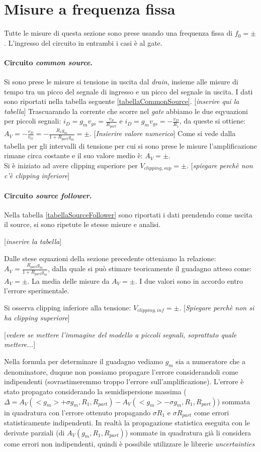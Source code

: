 \documentclass[10pt,a4paper]{article}
\newcommand{\rem}[1]{[\emph{#1}]}
\begin{document}
\section{Misure a frequenza fissa}
Tutte le misure di questa sezione sono prese usando una frequenza fissa di $f_0 = \pm$. L'ingresso del circuito in entrambi i casi è al gate.
\paragraph{Circuito \emph{common source}.}
Si sono prese le misure si tensione in uscita dal \emph{drain}, insieme alle misure di tempo tra un picco del segnale di ingresso e un picco del segnale in uscita. I dati sono riportati nella tabella seguente \ref{tabellaCommonSource}.
\rem{inserire qui la tabella}
Trascuarando la corrente che scorre nel \emph{gate} abbiamo le due eqyuazioni per piccoli segnali: $i_D = g_m v_{gs} = \frac{v_S}{R_{part}}$ e $i_D = g_m v_{gs} = -\frac{v_D}{R_1}$, da queste si ottiene: $A_V = -\frac{v_D}{v_G} = - \frac{R_1 g_m}{1+R_{part} g_m} = \pm $. \rem{Insierire valore numerico}
Come si vede dalla tabella per gli intervalli di tensione per cui si sono prese le misure l'amplificazione rimane circa costante e il suo valore medio è: $A_V = \pm$. \\
Si è iniziato ad avere clipping superiore per $V_{clipping, sup} = \pm $.
\rem{spiegare perchè non c'è clipping inferiore}

\paragraph{Circuito \emph{source follower}.}
Nella tabella \ref{tabellaSourceFollower} sono riportati i dati prendendo come uscita il source, si sono ripetute le stesse misure e analisi.

\rem{inserire la tabella}

Dalle stese equazioni della sezione precedente otteniamo la relazione: $A_V = \frac{R_{part} g_m}{1+R_{part} g_m}$, dalla quale si può stimare teoricamente il guadagno atteso come: $A_V = \pm$. La media delle misure da $A_V = \pm$. I due valori sono in accordo entro l'errore sperimentale.

Si osserva clipping inferiore alla tensione: $V_{clipping, inf} = \pm $. 
\rem{Spiegare perchè non si ha clipping superiore}

\rem{vedere se mettere l'immagine del modello a piccoli segnali, soprattuto quale mettere...}

Nella formula per determinare il guadagno vediamo $g_m$ sia a numeratore che a denominatore, duqnue non possiamo propagare l'errore considerandoli come indipendenti (sovrastimeremmo troppo l'errore sull'amplificazione). L'errore è stato propagato considerando la semidispersione massima ($\Delta = A_V(<g_m> + \sigma g_m, R_1, R_{part}) - A_V(<g_m> - \sigma g_m, R_1, R_{part})$) sommata in quadratura con l'errore ottenuto propagando $\sigma R_1$ e $\sigma R_{part}$ come errori statisticamente indipendenti.
In realtà la propagazione statistica eseguita con le derivate parziali (di $A_V(g_m, R_1, R_{part})$) sommate in quadratura già li considera come errori non indipendenti, quindi è possibile utilizzare le librerie \emph{uncertainties}
\end{document}

